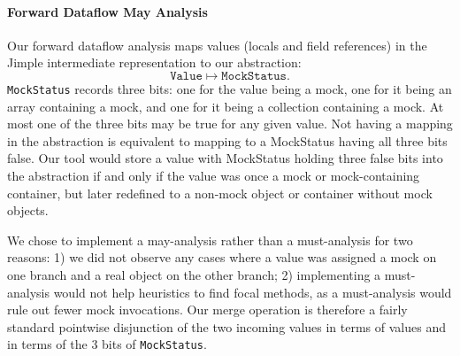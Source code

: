 \paragraph{Forward Dataflow May Analysis}
\label{subsubsec:forward}

Our forward dataflow analysis maps values (locals and field references) in the Jimple intermediate representation to our abstraction:
\[ \mathtt{Value} \mapsto \mathtt{MockStatus}. \]
\texttt{MockStatus} records three bits: one for the value being a mock, one for it being an array containing a mock, and one for it being a collection containing a mock. At most one of the three bits may be true for any given value. Not having a mapping in the abstraction is equivalent to mapping to a MockStatus having all three bits false. Our tool would store a value with MockStatus holding three false bits into the abstraction if and only if the value was once a mock or mock-containing container, but later redefined to a non-mock object or container without mock objects.

We chose to implement a may-analysis rather than a must-analysis for two reasons: 1) we did not observe any cases where a value was assigned a mock on one branch and a real object on the other branch; 2) implementing a must-analysis would not help heuristics to find focal methods, as a must-analysis would rule out fewer mock invocations. Our merge operation is therefore a fairly standard pointwise disjunction of the two incoming values in terms of values and in terms of the 3 bits of \texttt{MockStatus}.



